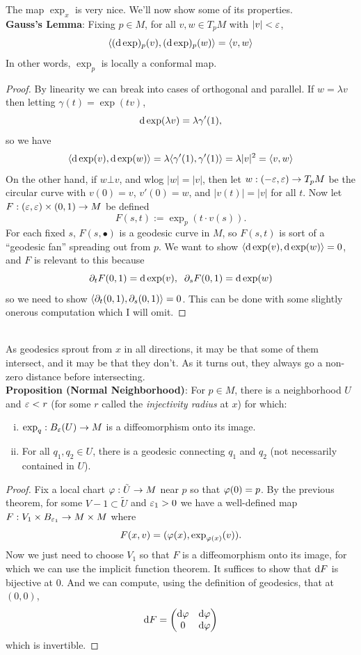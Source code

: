 \documentclass{amsart}
\begin{document}
	The map $\exp_x$ is very nice. We'll now show some of its properties.\\
	
	\noindent \textbf{Gauss's Lemma}: Fixing $p\in M$, for all $v,w\in T_pM$ with $|v|<\varepsilon$, 
	$$
	\langle(\textrm{d} \exp)_p(v), (\textrm{d} \exp)_p(w)\rangle = \langle v,w\rangle
	$$
	In other words, $\exp_p$ is locally a conformal map.
	\begin{proof}
		By linearity we can break into cases of orthogonal and parallel. If $w=\lambda v$ then letting $\gamma(t)=\exp(tv)$,
		$$
		\textrm{d} \exp(\lambda v) = \lambda \gamma'(1),
		$$
		so we have
		$$
		\langle\textrm{d}\exp(v),\textrm{d}\exp(w)\rangle = \lambda \langle\gamma'(1),\gamma'(1)\rangle= \lambda |v|^2 = \langle v,w\rangle
		$$
		On the other hand, if $w\bot v$, and wlog $|w|=|v|$, then let $w:(-\varepsilon,\varepsilon)\to T_pM$ be the circular curve with $v(0)=v$, $v'(0)=w$, and $|v(t)|=|v|$ for all $t$. Now let $F:(\varepsilon,\varepsilon)\times (0,1)\to M$ be defined
		$$
		F(s,t) := \exp_p(t\cdot v(s)).
		$$
		For each fixed $s$, $F(s,\bullet)$ is a geodesic curve in $M$, so $F(s,t)$ is sort of a ``geodesic fan'' spreading out from $p$. We want to show $\langle\textrm{d}\exp(v),\textrm{d}\exp(w)\rangle=0$, and $F$ is relevant to this because 
		$$
		\partial_t F(0,1) = \textrm{d}\exp(v), \;\; \partial_s F(0,1) = \textrm{d}\exp(w)
		$$
		so we need to show $\langle\partial_t(0,1),\partial_s(0,1)\rangle=0$. This can be done with some slightly onerous computation which I will omit.
	\end{proof}\\
	
	As geodesics sprout from $x$ in all directions, it may be that some of them intersect, and it may be that they don't. As it turns out, they always go a non-zero distance before intersecting.\\
	
	\noindent \textbf{Proposition (Normal Neighborhood)}: For $p\in M$, there is a neighborhood $U$ and $\varepsilon<r$ (for some $r$ called the \textit{injectivity radius} at $x$) for which:
	\begin{enumerate}[(i)]
		\item $\exp_q:B_{\varepsilon}(U)\to M$ is a diffeomorphism onto its image.
		\item For all $q_1,q_2\in U$, there is a geodesic connecting $q_1$ and $q_2$ (not necessarily contained in $U$).
	\end{enumerate}
	\begin{proof}
		Fix a local chart $\varphi:\tilde{U}\to M$ near $p$ so that $\varphi(0)=p$. By the previous theorem, for some $V-1\subset \tilde{U}$ and $\varepsilon_1>0$ we have a well-defined map $F:V_1\times B_{\varepsilon_1}\to M\times M$ where 
		$$
		F(x,v) = (\varphi(x),\exp_{\varphi(x)}(v)).
		$$
		Now we just need to choose $V_1$ so that $F$ is a diffeomorphism onto its image, for which we can use the implicit function theorem. It suffices to show that $\textrm{d} F$ is bijective at $0$. And we can compute, using the definition of geodesics, that at $(0,0)$,
		$$
		\textrm{d} F = \begin{pmatrix}
			\textrm{d} \varphi & \textrm{d} \varphi\\
			0 & \textrm{d} \varphi
		\end{pmatrix}
		$$
		which is invertible.
	\end{proof}\\
	
\end{document}

